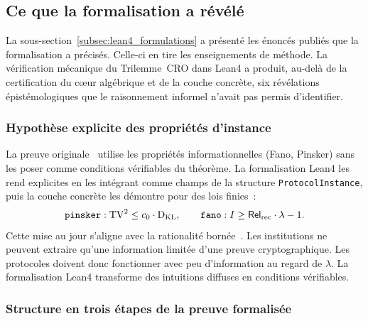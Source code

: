 \subsection{Ce que la formalisation a r\'ev\'el\'e}
\label{subsec:ce_que_formalisation_revele}
\begin{sloppypar}
La sous-section~\ref{subsec:lean4_formulations} a pr\'esent\'e les \'enonc\'es publi\'es que la formalisation
a pr\'ecis\'es. Celle-ci en tire les enseignements de m\'ethode.
La v\'erification m\'ecanique du Trilemme~CRO dans Lean4 a produit,
au-del\`a de la certification du c\oe ur alg\'ebrique et de la couche concr\`ete, six r\'ev\'elations
\'epist\'emologiques que le raisonnement informel n'avait pas permis
d'identifier.

\subsubsection{Hypoth\`ese explicite des propri\'et\'es d'instance}
\label{subsubsec:hypothese_quasi_optimalite}

La preuve originale~\cite{MINKA2026CRO} utilise les propri\'et\'es
informationnelles (Fano, Pinsker) sans les poser comme conditions
v\'erifiables du th\'eor\`eme. La formalisation Lean4 les rend
explicites en les int\'egrant comme champs de la structure
\texttt{ProtocolInstance}, puis la couche concr\`ete les d\'emontre pour des lois
finies~:
\begin{equation}
\texttt{pinsker} : \operatorname{TV}^2 \leq c_0 \cdot \operatorname{D_{\text{KL}}}, \qquad
\texttt{fano} : I \geq \mathsf{Rel}_{\mathrm{rec}} \cdot \lambda - 1.
\label{eq:hypothese_quasi_optimalite}
\end{equation}
Cette mise au jour s'aligne avec la rationalit\'e
born\'ee~\cite{Simon82,Miller56,Ericsson95}. Les institutions ne peuvent
extraire qu'une information limit\'ee d'une preuve cryptographique. Les protocoles doivent donc
fonctionner avec peu d'information au regard de $\lambda$. La formalisation Lean4 transforme des
intuitions diffuses en conditions v\'erifiables.

\subsubsection{Structure en trois \'etapes de la preuve formalis\'ee}
\label{subsubsec:non_derivabilite_borne}


\end{sloppypar}
